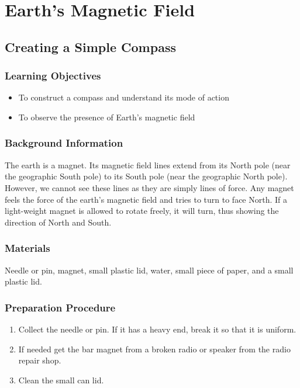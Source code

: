 \section{Earth's Magnetic Field}

\subsection{Creating a Simple Compass}

\subsubsection*{Learning Objectives}
\begin{itemize}
\item{To construct a compass and understand its mode of action}
\item{To observe the presence of Earth's magnetic field} 
\end{itemize}

\subsubsection*{Background Information}
The earth is a magnet.  Its magnetic field lines extend from its North pole (near the geographic South pole) to its South pole (near the geographic North pole).  However, we cannot see these lines as they are simply lines of force.
Any magnet feels the force of the earth's magnetic field and tries to turn to face North.  If a light-weight magnet is allowed to rotate freely, it will turn, thus showing the direction of North and South.

\subsubsection*{Materials}
Needle or pin, magnet, small plastic lid, water, small piece of paper, and a small plastic lid.

\subsubsection*{Preparation Procedure}
\begin{enumerate}
\item{Collect the needle or pin.  If it has a heavy end, break it so that it is uniform.} 
\item{If needed get the bar magnet from a broken radio or speaker from the radio repair shop.}
\item{Clean the small can lid.} 
\end{enumerate}

